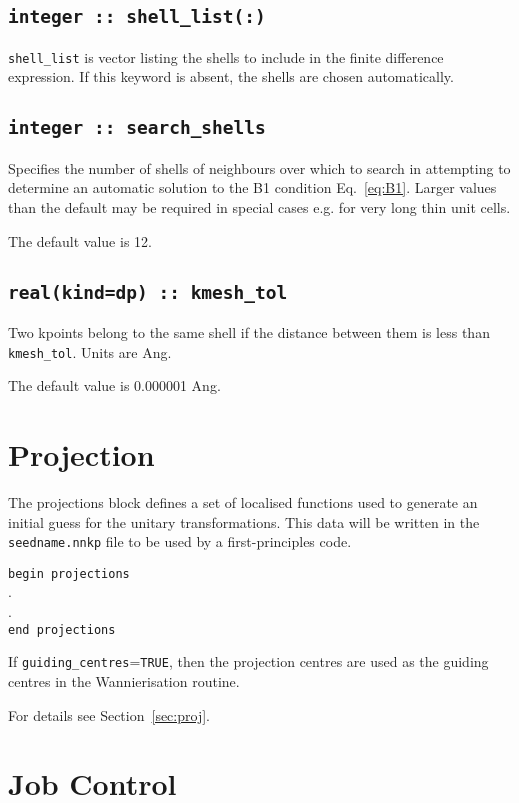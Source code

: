 \subsection[shell\_list]{\tt integer :: shell\_list(:)}

\verb#shell_list# is vector listing the shells
to include in the finite difference expression. If this keyword is
absent, the shells are chosen automatically.

\subsection[search\_shells]{\tt integer :: search\_shells}

Specifies the number of shells of neighbours over which to search in
attempting to determine an automatic solution to the B1 condition
Eq.~\ref{eq:B1}. Larger values than the default may be required in special
cases e.g. for very long thin unit cells. 

The default value is 12.


\subsection[kmesh\_tol]{\tt real(kind=dp) :: kmesh\_tol}

Two kpoints belong to the same shell if the distance between them is
less than {\tt kmesh\_tol}.
Units are Ang.

The default value is 0.000001 Ang.

\section{Projection}

 The projections block defines a set of localised functions used to
 generate an initial guess for the unitary transformations. 
This data will be written in the {\tt seedname.nnkp} file to be used
by a first-principles code.

\noindent \verb#begin projections# \\ 
  . \\ 
  . \\ 
\verb#end projections#

If \verb#guiding_centres#={\tt TRUE}, then the projection centres are
used as the guiding centres in the Wannierisation routine.

For details see Section~\ref{sec:proj}.

\section{Job Control}


